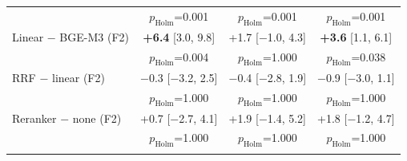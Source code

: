 \begin{table}[t]
\begin{tabular}{@{}lccc@{}}
 & {\scriptsize $p_{\mathrm{Holm}}$=0.001} & {\scriptsize $p_{\mathrm{Holm}}$=0.001} & {\scriptsize $p_{\mathrm{Holm}}$=0.001}\\[2pt]
Linear $-$ BGE-M3 (F2) & \textbf{+6.4} {\scriptsize[3.0, 9.8]} & +1.7 {\scriptsize[$-$1.0, 4.3]} & \textbf{+3.6} {\scriptsize[1.1, 6.1]}\\
 & {\scriptsize $p_{\mathrm{Holm}}$=0.004} & {\scriptsize $p_{\mathrm{Holm}}$=1.000} & {\scriptsize $p_{\mathrm{Holm}}$=0.038}\\[2pt]
RRF $-$ linear (F2) & $-$0.3 {\scriptsize[$-$3.2, 2.5]} & $-$0.4 {\scriptsize[$-$2.8, 1.9]} & $-$0.9 {\scriptsize[$-$3.0, 1.1]}\\
 & {\scriptsize $p_{\mathrm{Holm}}$=1.000} & {\scriptsize $p_{\mathrm{Holm}}$=1.000} & {\scriptsize $p_{\mathrm{Holm}}$=1.000}\\[2pt]
Reranker $-$ none (F2) & +0.7 {\scriptsize[$-$2.7, 4.1]} & +1.9 {\scriptsize[$-$1.4, 5.2]} & +1.8 {\scriptsize[$-$1.2, 4.7]}\\
 & {\scriptsize $p_{\mathrm{Holm}}$=1.000} & {\scriptsize $p_{\mathrm{Holm}}$=1.000} & {\scriptsize $p_{\mathrm{Holm}}$=1.000}\\[2pt]
\botrule
\end{tabular}

\vspace{6pt}


\end{table}
